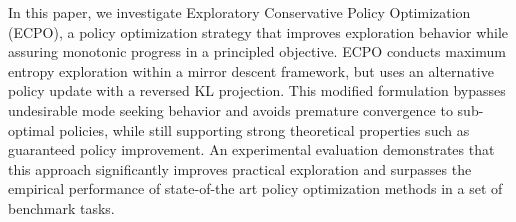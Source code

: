 
In this paper, we investigate Exploratory Conservative Policy Optimization (ECPO), a policy optimization strategy that improves exploration behavior while assuring monotonic progress in a principled objective. ECPO conducts maximum entropy exploration within a mirror descent framework, but uses an alternative policy update with a reversed KL projection. This modified formulation bypasses undesirable mode seeking behavior and avoids premature convergence to sub-optimal policies, while still supporting strong theoretical properties such as guaranteed policy improvement. An experimental evaluation demonstrates that this approach significantly improves practical exploration and surpasses the empirical performance of state-of-the art policy optimization methods in a set of benchmark tasks.

